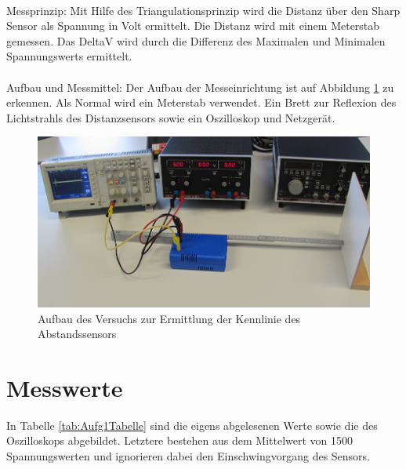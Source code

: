 \documentclass[12pt,oneside,a4paper]{report}
\begin{document}
\paragraph{} Messprinzip: Mit Hilfe des Triangulationsprinzip wird die Distanz über den Sharp Sensor als Spannung in Volt ermittelt. Die Distanz wird mit einem Meterstab gemessen. 
Das DeltaV wird durch die Differenz des Maximalen und Minimalen Spannungswerts ermittelt.

\paragraph{} Aufbau und Messmittel: Der Aufbau der Messeinrichtung ist auf Abbildung \ref{fig:VersuchsAufbauAufg1} zu erkennen. Als Normal wird ein Meterstab verwendet. Ein Brett zur Reflexion des Lichtstrahls des Distanzsensors sowie ein Oszilloskop und Netzgerät.

\begin{figure}[H]
	\centering\small
	\includegraphics[width=\textwidth]{src/VersuchsAufbauAufg1.png}
	\caption{Aufbau des  Versuchs zur Ermittlung der Kennlinie des Abstandssensors}
	\label{fig:VersuchsAufbauAufg1}
\end{figure}


\section{Messwerte}
\label{chap:VERSUCH_1_MESSWERTE}

In Tabelle \ref{tab:Aufg1Tabelle} sind die eigens abgelesenen Werte sowie die des Oszilloskops abgebildet. Letztere bestehen aus dem Mittelwert von 1500 Spannungswerten und ignorieren dabei den Einschwingvorgang des Sensors.
\end{document}
